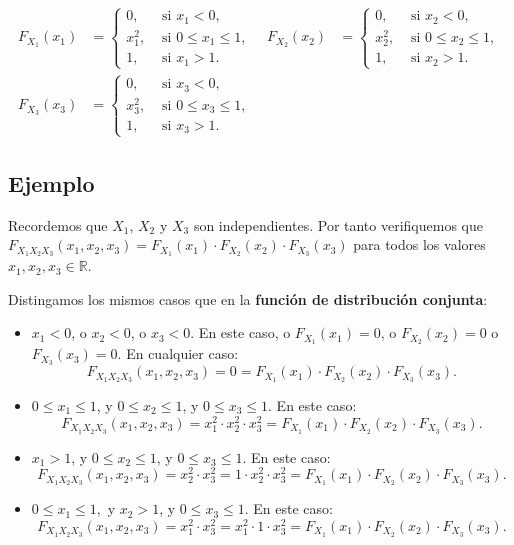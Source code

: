 \documentclass[]{book}
\begin{document}
\[
\begin{array}{rl}
F_{X_1}(x_1) & =\begin{cases}
0, & \mbox{ si }x_1<0, \\
x_1^2, & \mbox{ si }0\leq x_1\leq 1,\\
1, & \mbox{ si }x_1 > 1.
\end{cases}\quad F_{X_2}(x_2) & =\begin{cases}
0, & \mbox{ si }x_2<0, \\
x_2^2, & \mbox{ si }0\leq x_2\leq 1,\\
1, & \mbox{ si }x_2 > 1.
\end{cases}\\ F_{X_3}(x_3) & =\begin{cases}
0, & \mbox{ si }x_3<0, \\
x_3^2, & \mbox{ si }0\leq x_3\leq 1,\\
1, & \mbox{ si }x_3 > 1.
\end{cases}
\end{array}
\]

\hypertarget{ejemplo-125}{%
\subsection{Ejemplo}\label{ejemplo-125}}

Recordemos que \(X_1\), \(X_2\) y \(X_3\) son independientes. Por tanto verifiquemos que \(F_{X_1X_2X_3}(x_1,x_2,x_3)=F_{X_1}(x_1)\cdot F_{X_2}(x_2)\cdot F_{X_3}(x_3)\) para todos los valores \(x_1,x_2,x_3\in\mathbb{R}\).

Distingamos los mismos casos que en la \textbf{función de distribución conjunta}:

\begin{itemize}
\item
  \(x_1<0\), o \(x_2<0\), o \(x_3 <0\). En este caso, o \(F_{X_1}(x_1)=0\), o \(F_{X_2}(x_2)=0\) o \(F_{X_3}(x_3)=0\). En cualquier caso:
  \[
  F_{X_1X_2X_3}(x_1,x_2,x_3)=0= F_{X_1}(x_1)\cdot F_{X_2}(x_2)\cdot F_{X_3}(x_3).
  \]
\item
  \(0\leq x_1\leq 1\), y \(0\leq x_2\leq 1\), y \(0\leq x_3\leq 1\). En este caso:
  \[
  F_{X_1X_2X_3}(x_1,x_2,x_3)=x_1^2\cdot x_2^2\cdot x_3^2= F_{X_1}(x_1)\cdot F_{X_2}(x_2)\cdot F_{X_3}(x_3).
  \]
\item
  \(x_1> 1\), y \(0\leq x_2\leq 1\), y \(0\leq x_3\leq 1\). En este caso:
  \[
  F_{X_1X_2X_3}(x_1,x_2,x_3)=x_2^2\cdot x_3^2=1\cdot x_2^2\cdot x_3^2= F_{X_1}(x_1)\cdot F_{X_2}(x_2)\cdot F_{X_3}(x_3).
  \]
\item
  \(0\leq x_1\leq 1,\) y \(x_2> 1\), y \(0\leq x_3\leq 1\). En este caso:
  \[
  F_{X_1X_2X_3}(x_1,x_2,x_3)=x_1^2\cdot x_3^2=x_1^2\cdot 1\cdot x_3^2= F_{X_1}(x_1)\cdot F_{X_2}(x_2)\cdot F_{X_3}(x_3).
  \]
\end{itemize}
\end{document}

